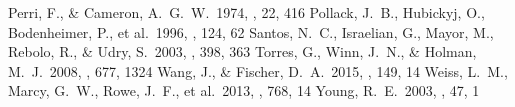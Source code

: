 \documentclass[twocolumn, dvipdfmx]{aastex62}
\begin{document}
\begin{CJK*}{UTF8}{min}
\begin{thebibliography}{}
 Perri, F., \& Cameron, A.~G.~W.\ 1974, \icarus, 22, 416
 Pollack, J.~B., Hubickyj, O., Bodenheimer, P., et al.\ 1996, \icarus, 124, 62
 Santos, N.~C., Israelian, G., Mayor, M., Rebolo, R., \& Udry, S.\ 2003, \aap, 398, 363
 Torres, G., Winn, J.~N., \& Holman, M.~J.\ 2008, \apj, 677, 1324
 Wang, J., \& Fischer, D.~A.\ 2015, \aj, 149, 14
 Weiss, L.~M., Marcy, G.~W., Rowe, J.~F., et al.\ 2013, \apj, 768, 14
 Young, R.~E.\ 2003, \nar, 47, 1

\end{thebibliography}

\appendix

\end{CJK*}
\end{document}
